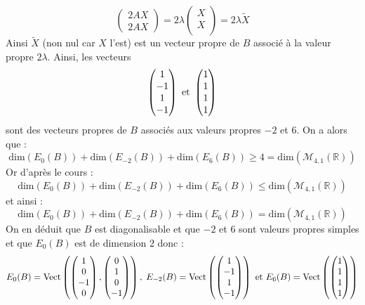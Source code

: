 \documentclass[a4paper,10pt]{report}
\begin{document}
\begin{enumerate}
$$\begin{pmatrix}
2 AX \\
2AX
\end{pmatrix} = 2 \lambda \begin{pmatrix}
X \\
X \\
\end{pmatrix} = 2 \lambda \tilde{X}$$
Ainsi $\tilde{X}$ (non nul car $X$ l'est) est un vecteur propre de $B$ associé à la valeur propre $2 \lambda$. Ainsi, les vecteurs 
$$ \begin{pmatrix}
1 \\
-1 \\
1 \\
-1
\end{pmatrix} \hbox{ et } \begin{pmatrix}
1 \\
1 \\
1 \\
1 \\
\end{pmatrix}$$
sont des vecteurs propres de $B$ associés aux valeurs propres $-2$ et $6$. On a alors que :
$$ \textrm{dim}(E_0(B)) + \textrm{dim}(E_{-2}(B)) + \textrm{dim}(E_6(B))  \geq 4 = \textrm{dim}(\mathcal{M}_{4,1}(\mathbb{R}))$$
Or d'après le cours :
$$ \textrm{dim}(E_0(B)) + \textrm{dim}(E_{-2}(B)) + \textrm{dim}(E_6(B))  \leq \textrm{dim}(\mathcal{M}_{4,1}(\mathbb{R}))$$
et ainsi :
$$ \textrm{dim}(E_0(B)) + \textrm{dim}(E_{-2}(B)) + \textrm{dim}(E_6(B))  = \textrm{dim}(\mathcal{M}_{4,1}(\mathbb{R}))$$
On en déduit que $B$ est diagonalisable et que $-2$ et $6$ sont valeurs propres simples et que $E_0(B)$ est de dimension $2$ donc :
$$ E_0(B) = \textrm{Vect} \left(\begin{pmatrix}
1 \\
0 \\
-1 \\
0
\end{pmatrix},\begin{pmatrix}
0 \\
1 \\
0 \\
-1
\end{pmatrix}\right), \;  E_{-2}(B) = \textrm{Vect} \left( \begin{pmatrix}
1 \\
-1 \\
1 \\
-1
\end{pmatrix}\right) \hbox{ et } E_{6}(B) = \textrm{Vect} \left(\begin{pmatrix}
1 \\
1 \\
1 \\
1
\end{pmatrix}\right)$$
\end{enumerate}
\end{document}
